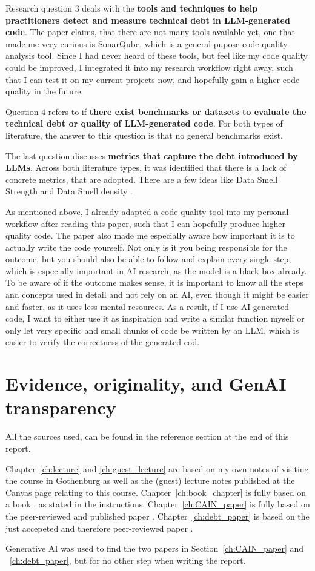 \documentclass[11pt]{article}
\begin{document}
Research question 3 deals with the \textbf{tools and techniques to help practitioners detect and measure technical debt in LLM-generated code}. The paper claims, that there are not many tools available yet, one that made me very curious is SonarQube, which is a general-pupose code quality analysis tool. Since I had never heard of these tools, but feel like my code quality could be improved, I integrated it into my research workflow right away, such that I can test it on my current projects now, and hopefully gain a higher code quality in the future.

Question 4 refers to if \textbf{there exist benchmarks or datasets to evaluate the technical debt or quality of LLM-generated code}. For both types of literature, the answer to this question is that no general benchmarks exist.

The last question discusses \textbf{metrics that capture the debt introduced by LLMs}. Across both literature types, it was identified that there is a lack of concrete metrics, that are adopted. There are a few ideas like Data Smell Strength and Data Smell density \cite{Foidl2022Datasmells}.

As mentioned above, I already adapted a code quality tool into my personal workflow after reading this paper, such that I can hopefully produce higher quality code. The paper also made me especially aware how important it is to actually write the code yourself. Not only is it you being responsible for the outcome, but you should also be able to follow and explain every single step, which is especially important in AI research, as the model is a black box already. To be aware of if the outcome makes sense, it is important to know all the steps and concepts used in detail and not rely on an AI, even though it might be easier and faster, as it uses less mental resources. As a result, if I use AI-generated code, I want to either use it as inspiration and write a similar function myself or only let very specific and small chunks of code be written by an LLM, which is easier to verify the correctness of the generated cod.


\section{Evidence, originality, and GenAI transparency}
All the sources used, can be found in the reference section at the end of this report.

Chapter~\ref{ch:lecture} and \ref{ch:guest_lecture} are based on my own notes of visiting the course in Gothenburg as well as the (guest) lecture notes published at the Canvas page relating to this course. Chapter~\ref{ch:book_chapter} is fully based on a book \citep{Kastner2025Machine}, as stated in the instructions. Chapter~\ref{ch:CAIN_paper} is fully based on the peer-reviewed and published paper \citep{Wu2024Exploratory}. Chapter~\ref{ch:debt_paper} is based on the just accepeted and therefore peer-reviewed paper \citep{Ehsani2026Faster}.

Generative AI was used to find the two papers in Section~\ref{ch:CAIN_paper} and ~\ref{ch:debt_paper}, but for no other step when writing the report.




\end{document}
